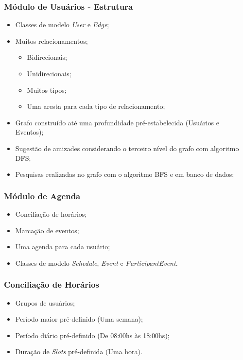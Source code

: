 \documentclass{beamer}
\begin{document}
\begin{frame}
\frametitle{Módulo de Usuários - Estrutura}

\begin{itemize}
	\item Classes de modelo \textit{User} e \textit{Edge};
	\item Muitos relacionamentos;
	\begin{itemize}
		\item Bidirecionais;
		\item Unidirecionais;
		\item Muitos tipos;
		\item Uma aresta para cada tipo de relacionamento;
	\end{itemize}
	\item Grafo construído até uma profundidade pré-estabelecida (Usuários e Eventos);
	\item Sugestão de amizades considerando o terceiro nível do grafo com algoritmo DFS;
	\item Pesquisas realizadas no grafo com o algoritmo BFS e em banco de dados;
\end{itemize}

\end{frame}

\begin{frame}
\frametitle{Módulo de Agenda}

\begin{itemize}
	\item Conciliação de horários;
	\item Marcação de eventos;
	\item Uma agenda para cada usuário;
	\item Classes de modelo \textit{Schedule}, \textit{Event} e \textit{ParticipantEvent}.
\end{itemize}

\end{frame}

\begin{frame}
\frametitle{Conciliação de Horários}

\begin{itemize}
	\item Grupos de usuários;
	\item Período maior pré-definido (Uma semana);
	\item Período diário pré-definido (De 08:00hs às 18:00hs);
	\item Duração de \textit{Slots} pré-definida (Uma hora).
\end{itemize}

\end{frame}
\end{document}

